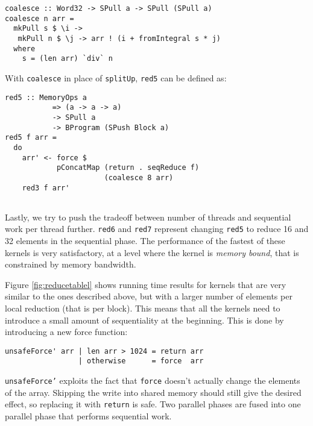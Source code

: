 \begin{small} 
\begin{Verbatim}[samepage = true] 
coalesce :: Word32 -> SPull a -> SPull (SPull a)
coalesce n arr =
  mkPull s $ \i ->
   mkPull n $ \j -> arr ! (i + fromIntegral s * j)
  where
    s = (len arr) `div` n 
\end{Verbatim}
\end{small}

\noindent
With {\tt coalesce} in place of {\tt splitUp}, {\tt red5} can be defined as: 

\begin{small} 
\begin{Verbatim}[samepage = true] 
red5 :: MemoryOps a
           => (a -> a -> a)
           -> SPull a
           -> BProgram (SPush Block a)
red5 f arr =
  do
    arr' <- force $  
            pConcatMap (return . seqReduce f)
                       (coalesce 8 arr)
    red3 f arr' 
  
\end{Verbatim}
\end{small}%


Lastly, we try to push the tradeoff between number of threads and sequential 
work per thread further. {\tt red6} and {\tt red7} represent  
changing {\tt red5} to reduce 16 and 32 elements in the sequential phase.
The performance of the fastest of these kernels is very satisfactory, at a level where the kernel is {\em memory bound}, that is constrained
by memory bandwidth.

Figure \ref{fig:reducetablel} shows running time results for kernels that are 
very similar to the ones described above, but with a larger number 
of elements per local reduction (that is per block). This means that all the kernels need 
to introduce a small amount of sequentiality at the beginning. This is 
done by introducing a new force function:  

\begin{small}
\begin{Verbatim}[samepage=true] 
unsafeForce' arr | len arr > 1024 = return arr
                 | otherwise      = force  arr 
\end{Verbatim} 
\end{small}  

\noindent
{\tt unsafeForce'} exploits the fact that {\tt force} doesn't actually
change the elements of the array. 
Skipping the write into shared memory should still give the desired effect,
so replacing it with \verb!return! is safe. Two parallel phases are fused into one parallel phase that performs sequential work. 

